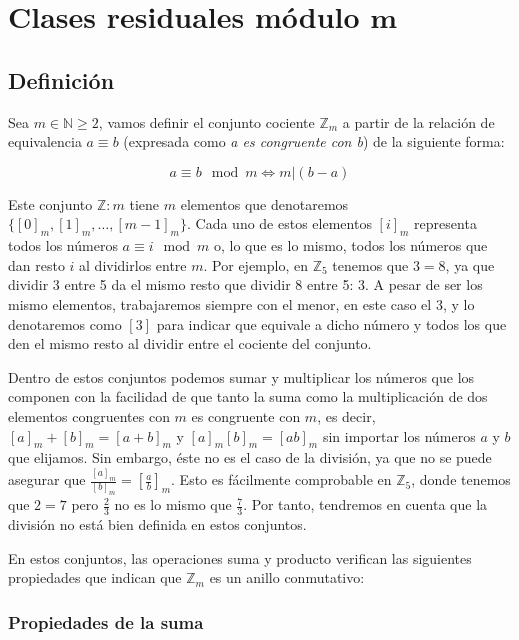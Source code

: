 \section{Clases residuales módulo $\boldsymbol{m}$}\label{clases-residuales-modulo-m}

\subsection{Definición}

Sea $m \in \mathbb{N} \geq 2$, vamos definir el conjunto cociente $\mathbb{Z}_m$ a partir de la relación de equivalencia $a \equiv b$ (expresada como \textit{a es congruente con b}) de la siguiente forma:

\[a \equiv b \mod m \iff m|(b-a)\]

Este conjunto $\mathbb{Z}:m$ tiene $m$ elementos que denotaremos $\{{[0]}_m, {[1]}_m, \ldots, {[m-1]}_m\}$.
Cada uno de estos elementos ${[i]}_m$ representa todos los números $a \equiv i \mod m$ o, lo que es lo mismo, todos los números que dan resto $i$ al dividirlos entre $m$.
Por ejemplo, en $\mathbb{Z}_5$ tenemos que $3 = 8$, ya que dividir 3 entre 5 da el mismo resto que dividir 8 entre 5: 3.
A pesar de ser los mismo elementos, trabajaremos siempre con el menor, en este caso el 3, y lo denotaremos como $[3]$ para indicar que equivale a dicho número y todos los que den el mismo resto al dividir entre el cociente del conjunto.

Dentro de estos conjuntos podemos sumar y multiplicar los números que los componen con la facilidad de que tanto la suma como la multiplicación de dos elementos congruentes con $m$ es congruente con $m$, es decir, ${[a]}_m + {[b]}_m = {[a+b]}_m$ y ${[a]}_m{[b]}_m = {[ab]}_m$ sin importar los números $a$ y $b$ que elijamos.
Sin embargo, éste no es el caso de la división, ya que no se puede asegurar que $\frac{{[a]}_m}{{[b]}_m} = {[\frac{a}{b}]}_m$.
Esto es fácilmente comprobable en $\mathbb{Z}_5$, donde tenemos que $2 = 7$ pero $\frac{2}{3}$ no es lo mismo que $\frac{7}{3}$.
Por tanto, tendremos en cuenta que la división no está bien definida en estos conjuntos.

En estos conjuntos, las operaciones suma y producto verifican las siguientes propiedades que indican que $\mathbb{Z}_m$ es un anillo conmutativo:

\subsubsection{Propiedades de la suma}

